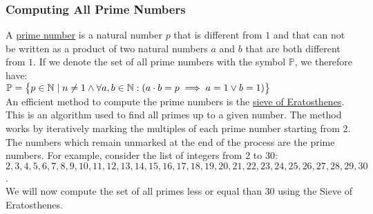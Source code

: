 \subsubsection{Computing All Prime Numbers}
A \href{https://en.wikipedia.org/wiki/Prime_number}{prime number} is a natural number $p$ that is different from $1$
and that can not be written as a product of two natural numbers $a$ and $b$ that are both different from $1$.  If
we denote the set of all prime numbers with the symbol $\mathbb{P}$, we therefore have:
\\[0.2cm]
\hspace*{1.3cm}
$\displaystyle \mathbb{P} = \bigl\{ p \in \mathbb{N} \mid n \not= 1 \wedge \forall a, b \in \mathbb{N}:(a \cdot b = p
\implies a = 1 \vee b = 1) \bigr\}$
\\[0.2cm]
An efficient method to compute the prime numbers is the
\href{https://en.wikipedia.org/wiki/Sieve_of_Eratosthenes}{sieve of Eratosthenes}.
This is an algorithm used to find all primes up to a given number. The method works by iteratively marking the
multiples of each prime number starting from 2. The numbers which remain unmarked at the end of the process are
the prime numbers.  For example, consider the list of integers from 2 to 30:
\\[0.2cm]
\hspace*{0.3cm}
$2, 3, 4, 5, 6, 7, 8, 9, 10, 11, 12, 13, 14, 15, 16, 17, 18, 19, 20, 21, 22, 23, 24, 25, 26, 27, 28, 29, 30$.
\\[0.2cm]
We will now compute the set of all primes less or equal than 30 using the Sieve of Eratosthenes.
